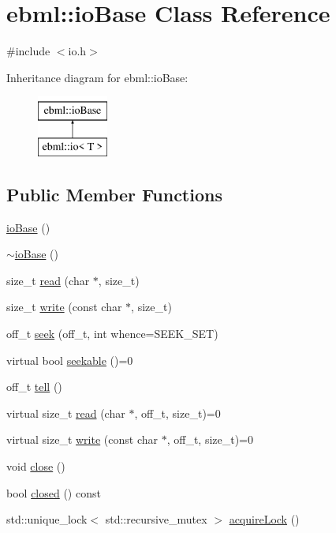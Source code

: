 \hypertarget{classebml_1_1ioBase}{}\section{ebml\+:\+:io\+Base Class Reference}
\label{classebml_1_1ioBase}


{\ttfamily \#include $<$io.\+h$>$}

Inheritance diagram for ebml\+:\+:io\+Base\+:\begin{figure}[H]
\begin{center}
\leavevmode
\includegraphics[height=2.000000cm]{classebml_1_1ioBase}
\end{center}
\end{figure}
\subsection*{Public Member Functions}
\begin{DoxyCompactItemize}
\item 
\mbox{\hyperlink{classebml_1_1ioBase_af0d31f731961fad7d3db80ba51a44ad1}{io\+Base}} ()
\item 
\mbox{\hyperlink{classebml_1_1ioBase_a97917f5c8816a035e3bc3f2e300da596}{$\sim$io\+Base}} ()
\item 
size\+\_\+t \mbox{\hyperlink{classebml_1_1ioBase_a3c2cd427ce1fd34a93959778a3fd4efa}{read}} (char $\ast$, size\+\_\+t)
\item 
size\+\_\+t \mbox{\hyperlink{classebml_1_1ioBase_a3895c5e0f86ecdcedaa288e87d68ccad}{write}} (const char $\ast$, size\+\_\+t)
\item 
off\+\_\+t \mbox{\hyperlink{classebml_1_1ioBase_ac4a5db64f2c7c8e791039f1b269d8f1a}{seek}} (off\+\_\+t, int whence=S\+E\+E\+K\+\_\+\+S\+ET)
\item 
virtual bool \mbox{\hyperlink{classebml_1_1ioBase_a413541f633f97d68021cbf58837e1970}{seekable}} ()=0
\item 
off\+\_\+t \mbox{\hyperlink{classebml_1_1ioBase_af0911dd01f1bb6a7ab284770c178db59}{tell}} ()
\item 
virtual size\+\_\+t \mbox{\hyperlink{classebml_1_1ioBase_aba93b64f19016207b3d6c43183a2be07}{read}} (char $\ast$, off\+\_\+t, size\+\_\+t)=0
\item 
virtual size\+\_\+t \mbox{\hyperlink{classebml_1_1ioBase_ad4a000de5db86375be0bf338130f76c9}{write}} (const char $\ast$, off\+\_\+t, size\+\_\+t)=0
\item 
void \mbox{\hyperlink{classebml_1_1ioBase_a802fbbe754413842f45251daa8294965}{close}} ()
\item 
bool \mbox{\hyperlink{classebml_1_1ioBase_a9dea7dea0e8d87a537e652e7f40128e9}{closed}} () const
\item 
std\+::unique\+\_\+lock$<$ std\+::recursive\+\_\+mutex $>$ \mbox{\hyperlink{classebml_1_1ioBase_a8414aaadabbfdc746e810527bc76a93d}{acquire\+Lock}} ()
\end{DoxyCompactItemize}
